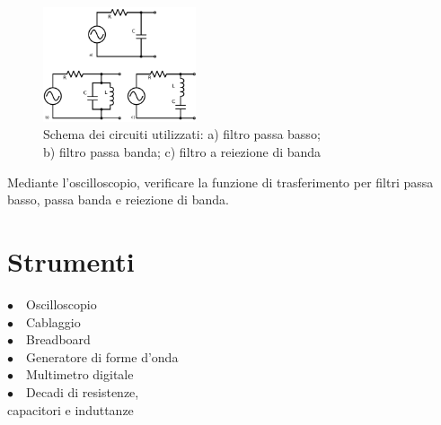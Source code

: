 \begin{figure}
	\centering
    \includegraphics[width=0.40\textwidth]{circuiti2.pdf}
    \caption{Schema dei circuiti utilizzati: a) filtro passa basso;\\ b) filtro passa banda; c) filtro a reiezione di banda}
    \label{fig:circuito}
\end{figure}

Mediante l'oscilloscopio, verificare la funzione di trasferimento per filtri passa basso, passa banda e reiezione di banda.
\section{Strumenti}

$\bullet \quad$Oscilloscopio \\
$\bullet \quad$Cablaggio\\
$\bullet \quad$Breadboard\\
$\bullet \quad$Generatore di forme d'onda\\
$\bullet \quad$Multimetro digitale\\
$\bullet \quad$Decadi di resistenze,\\
\phantom{xxx}capacitori e induttanze\\
